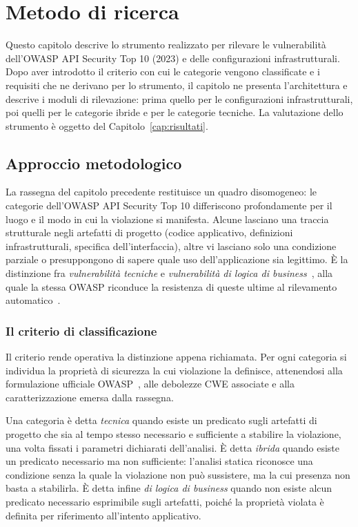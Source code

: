 
\chapter{Metodo di ricerca}
\label{cap:metodo}

Questo capitolo descrive lo strumento realizzato per rilevare le
vulnerabilità dell'OWASP API Security Top 10 (2023) e delle configurazioni
infrastrutturali. Dopo aver introdotto il criterio con cui le categorie vengono
classificate e i requisiti che ne derivano per lo strumento, il capitolo ne
presenta l'architettura e descrive i moduli di rilevazione: prima quello per
le configurazioni infrastrutturali, poi quelli per le categorie ibride e per le
categorie tecniche. La valutazione dello strumento è oggetto del
Capitolo~\ref{cap:risultati}.

\section{Approccio metodologico}
\label{sec:approccio-metodologico}

La rassegna del capitolo precedente restituisce un quadro disomogeneo:
le categorie dell'OWASP API Security Top 10 differiscono profondamente per
il luogo e il modo in cui la violazione si manifesta. Alcune lasciano una
traccia strutturale negli artefatti di progetto (codice applicativo,
definizioni infrastrutturali, specifica dell'interfaccia), altre vi lasciano
solo una condizione parziale o presuppongono di sapere quale
uso dell'applicazione sia legittimo. È la distinzione fra
\emph{vulnerabilità tecniche} e \emph{vulnerabilità di logica di
business}~\cite{felmetsger2010logic,pellegrino2014logic}, alla quale la stessa
OWASP riconduce la resistenza di queste ultime al rilevamento
automatico~\cite{owasp2023api6}.

\subsection{Il criterio di classificazione}
\label{sec:criterio}

Il criterio rende operativa la distinzione appena richiamata. Per ogni categoria si individua la
proprietà di sicurezza la cui violazione la definisce, attenendosi alla
formulazione ufficiale OWASP~\cite{owasp2023apitop10}, alle debolezze CWE
associate e alla caratterizzazione emersa dalla rassegna.

Una categoria è detta \emph{tecnica} quando esiste un predicato sugli artefatti
di progetto che sia al tempo stesso necessario e sufficiente a stabilire la
violazione, una volta fissati i parametri dichiarati dell'analisi. È detta
\emph{ibrida} quando esiste un predicato necessario ma non sufficiente:
l'analisi statica riconosce una condizione senza la quale la
violazione non può sussistere, ma la cui presenza non basta a stabilirla. È
detta infine \emph{di logica di business} quando non esiste alcun predicato
necessario esprimibile sugli artefatti, poiché la proprietà violata è
definita per riferimento all'intento applicativo.

